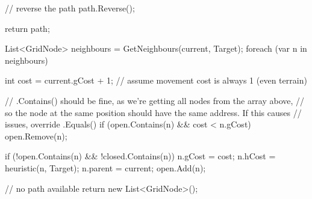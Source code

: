 \documentclass[11pt]{article}
\begin{document}
\begin{code}
{{{{{                    // reverse the path
                    path.Reverse();

                    return path;
                }

                 List<GridNode> neighbours = GetNeighbours(current, Target);
                    foreach (var n in neighbours)
                    {
                        int cost = current.gCost + 1; // assume movement cost is always 1 (even terrain)

                        // .Contains() should be fine, as we're getting all nodes from the array above,
                        // so the node at the same position should have the same address. If this causes
                        // issues, override .Equals()
                        if (open.Contains(n) && cost < n.gCost)
                        {
                            open.Remove(n);
                        }

                        if (!open.Contains(n) && !closed.Contains(n)) {
                            n.gCost = cost;
                            n.hCost = heuristic(n, Target);
                            n.parent = current;
                            open.Add(n);
                        }
                    }
                }
            
            // no path available
            return new List<GridNode>();
        }
    }
}
\end{code}
\end{document}

